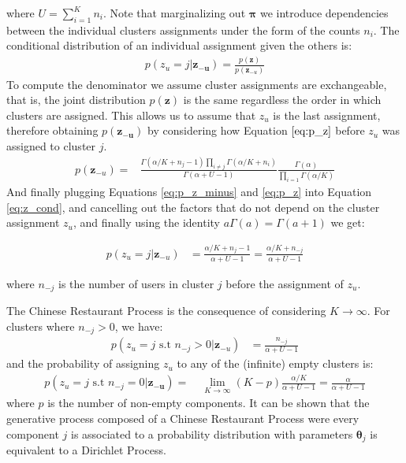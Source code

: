 \documentclass[smallextended]{svjour3}          %
\begin{document}
where $U=\sum_{i=1}^{K}n_i$. Note that marginalizing out $\boldsymbol{\pi}$ we introduce dependencies between the individual clusters assignments under the form of the counts  $n_i$. The conditional distribution of an individual assignment given the others is:
\begin{align}
\label{eq:z_cond}
p(z_u  = j| \mathbf{z_{-u}}) 
=
\frac{p(\mathbf{z})}
{p(\mathbf{z}_{-u})}
\end{align}
To compute the denominator we assume cluster assignments are exchangeable, that is, the joint distribution $p(\mathbf{z})$ is the same regardless the order in which clusters are assigned. This allows us to assume that $z_u$ is the last assignment, therefore obtaining $p(\mathbf{z_{-u}})$ by considering how Equation $\ref{eq:p_z}$ before $z_u$ was assigned to cluster $j$. 
\begin{align}
\label{eq:p_z_minus}
p(\mathbf{z}_{-u}) =& 
\frac
{
\Gamma(\alpha/K + n_j-1)
\prod_{i\neq j} \Gamma(\alpha/K + n_i)
}
{\Gamma
\left(
\alpha + U -1 
\right)
}
\frac{
\Gamma \left(\alpha \right)
}
{
\prod_{i=1} \Gamma(\alpha/K)
}
\end{align}
And finally plugging Equations \ref{eq:p_z_minus} and \ref{eq:p_z} into Equation \ref{eq:z_cond}, and cancelling out the factors that do not depend on  the cluster assignment $z_u$, and finally using the identity $a \Gamma(a) = \Gamma(a+1)$ we get:

\begin{align*}
p(z_u = j| \mathbf{z}_{-u}) 
&=
\frac
{\alpha/K + n_j-1}
{\alpha + U -1}
=
\frac
{\alpha/K + n_{-j}}
{\alpha + U -1} 
\end{align*}

where $n_{-j}$ is the number of users in cluster $j$ before the assignment of $z_u$.

The Chinese Restaurant Process is the consequence of considering $K \rightarrow \infty$. For clusters where $n_{-j}>0$, we have:
\begin{align*}
p(z_u = j \text{ s.t } n_{-j}>0 | \mathbf{z}_{-u}) 
&=
\frac
{n_{-j}}
{\alpha + U -1}
\end{align*}
and the probability of assigning $z_u$ to any of the (infinite) empty clusters is: 
\begin{align*}
p(z_u = j \text{ s.t } n_{-j}=0 | \mathbf{z_{-u}}) 
=\;& \lim_{K\rightarrow \infty}
(K - p)\frac
{\alpha/K}
{\alpha + U -1} 
= 
\frac
{\alpha}
{\alpha + U -1} 
\end{align*}
where $p$ is the number of non-empty components.
It can be shown that the generative process composed of a Chinese Restaurant Process were every component $j$ is associated to a probability distribution with parameters $\boldsymbol{\theta}_j$ is equivalent to a Dirichlet Process.
\end{document}

